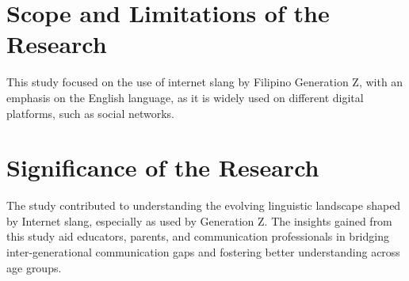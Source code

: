 \section{Scope and Limitations of the Research}
\label{sec:scope}
This study focused on the use of internet slang by Filipino Generation Z, with an emphasis on the English language, as it is widely used on different digital platforms, such as social networks.

\section{Significance of the Research}
\label{sec:significance}
The study contributed to understanding the evolving linguistic landscape shaped by Internet slang, especially as used by Generation Z.
The insights gained from this study aid educators, parents, and communication professionals in bridging inter-generational communication gaps and fostering better understanding across age groups.